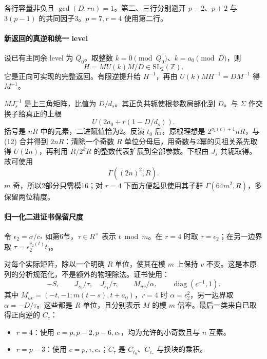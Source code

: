 {各行容量非负且} \(\gcd(D,rn)=1\){。第二、三行分别避开} \(p-2\){、}\(p+2\) {与} \(3(p-1)\) {的共同因子3。}\(p=7,r=4\) {使用第二行。}

\paragraph*{\texorpdfstring{{新返回的真逆和统一} {level}}{新返回的真逆和统一 level}}\label{C14-h103}

{设已有主同余} {level} {为} \(Q_0\){。取整数} \(k=0\pmod{Q_0}\){、}\(k=a_0\pmod D\){，则} \[
H=M U(k) M/D\in\mathrm{SL}_2(\mathbb Z).
\] {它是正向可实现的完整返回。有限逆提升给} \(H^{-1}\){，再由} \(U(k)MH^{-1}=DM^{-1}\) {得} \(M^{-1}\){。}

\(MJ_s^{-1}\) {是上三角矩阵，比值为} \(D/d_s\){。其正负共轭使根参数局部化到} \(D\){。与} \(\Sigma\) {作交换子给真正的上根} \[
U\!\left(2a_0+r(1-D/d_s)\right).\tag{C14.12}
\] {括号是} \(nR\) {中的元素，二进赋值恰为2。反演} \(t_0\) {后，原根理想是} \(2^{v_2(t)+1}nR\){，与} {(12)} {合并得到} \(2nR\){：清除一个奇数} \(R\) {单位分母后，用奇数与2幂的贝祖关系先取得} \(U(2n)\){，再利用} \(R/2^kR\) {的整数代表扩展到全部参数。下根由} \(J_s\) {共轭取得。故可使用} \[
\Gamma((2n)^2,R).
\] \(m\) {奇，所以2部分只需模16；对} \(r=4\) {下面方便起见使用其子群} \(\Gamma(64m^2,R)\){，多保留两位精度。}

\paragraph*{\texorpdfstring{{归一化二进证书保留尺度}}{归一化二进证书保留尺度}}\label{C14-h104}

{令} \(\epsilon_2=\sigma/c_*\) {如第6节，}\(\tau\in R^\times\) {表示} \(t\bmod m\){。在} \(r=4\) {时取} \(\tau=\epsilon_2\){；在另一边界取} \(\tau=\epsilon_2^{v_2(t)}t_0\){。}

{对每个实际矩阵，除以一个明确} \(R\) {单位，使其在模} \(m\) {上保持} \(v\) {不变。这是本原列的分析规范化，不是额外的物理除法。证书使用：} \[
-S,\qquad J_{s_0}/\tau,\quad J_{s_1}/\tau,\qquad
M_{uv}/\alpha,\qquad \operatorname{diag}(c^{-1},1).
\tag{C14.13}
\] {其中} \(M_{uv}=(-t,-1;m(t-s),t+a_0)\){，}\(r=4\) {时} \(\alpha=\epsilon_2^2\){，另一边界取} \(\alpha=-D/\tau\){。这些都是} \(R\) {单位，且分别表示} \(M\) {的模} \(m\) {倍率。最后一类来自已取得正向逆的} \(C_c\){：}

\begin{itemize}
\tightlist
\item
  \(r=4\){：使用} \(c=p,p-2,p-6,c_*\){，均为允许的小奇数且与} \(n\) {互素。}
\item
  \(r=p-3\){：使用} \(c=p,\tau,c_*\){；}\(C_\tau\) {是} \(C_{t_0}\){、}\(C_{c_*}\) {与换块的乘积。}
\end{itemize}

